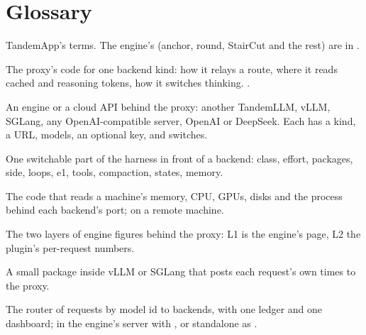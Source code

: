 \chapter{Glossary}\label{ch:glossary}

TandemApp's terms. The engine's (anchor, round, StairCut and the rest) are in .

\begin{description}[style=unboxed, leftmargin=0pt, itemsep=.5ex, font=\normalfont\bfseries]

\item[adapter] The proxy's code for one backend kind: how it relays a route, where it reads cached and reasoning tokens, how it switches thinking. .

\item[backend] An engine or a cloud API behind the proxy: another TandemLLM, vLLM, SGLang, any OpenAI-compatible server, OpenAI or DeepSeek. Each has a kind, a URL, models, an optional key, and switches.

\item[feature group] One switchable part of the harness in front of a backend: class, effort, packages, side, loops, e1, tools, compaction, states, memory.

\item[host collector] The code that reads a machine's memory, CPU, GPUs, disks and the process behind each backend's port;  on a remote machine.

\item[L1, L2] The two layers of engine figures behind the proxy: L1 is the engine's  page, L2 the plugin's per-request numbers.

\item[plugin] A small package inside vLLM or SGLang that posts each request's own times to the proxy.

\item[proxy] The router of requests by model id to backends, with one ledger and one dashboard; in the engine's server with , or standalone as .

\end{description}
